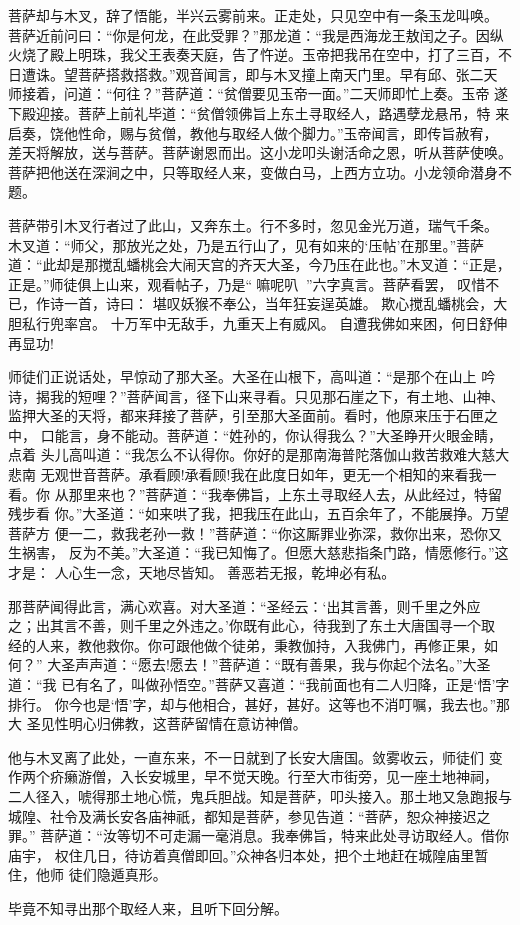 菩萨却与木叉，辞了悟能，半兴云雾前来。正走处，只见空中有一条玉龙叫唤。
菩萨近前问曰：“你是何龙，在此受罪？”那龙道：“我是西海龙王敖闰之子。因纵
火烧了殿上明珠，我父王表奏天庭，告了忤逆。玉帝把我吊在空中，打了三百，不
日遭诛。望菩萨搭救搭救。”观音闻言，即与木叉撞上南天门里。早有邱、张二天
师接着，问道：“何往？”菩萨道：“贫僧要见玉帝一面。”二天师即忙上奏。玉帝
遂下殿迎接。菩萨上前礼毕道：“贫僧领佛旨上东土寻取经人，路遇孽龙悬吊，特
来启奏，饶他性命，赐与贫僧，教他与取经人做个脚力。”玉帝闻言，即传旨赦宥，
差天将解放，送与菩萨。菩萨谢恩而出。这小龙叩头谢活命之恩，听从菩萨使唤。
菩萨把他送在深涧之中，只等取经人来，变做白马，上西方立功。小龙领命潜身不
题。

菩萨带引木叉行者过了此山，又奔东土。行不多时，忽见金光万道，瑞气千条。
木叉道：“师父，那放光之处，乃是五行山了，见有如来的‘压帖’在那里。”菩萨
道：“此却是那搅乱蟠桃会大闹天宫的齐天大圣，今乃压在此也。”木叉道：“正是，
正是。”师徒俱上山来，观看帖子，乃是“嘛呢叭”六字真言。菩萨看罢，
叹惜不已，作诗一首，诗曰：
堪叹妖猴不奉公，当年狂妄逞英雄。
欺心搅乱蟠桃会，大胆私行兜率宫。
十万军中无敌手，九重天上有威风。
自遭我佛如来困，何日舒伸再显功!

师徒们正说话处，早惊动了那大圣。大圣在山根下，高叫道：“是那个在山上
吟诗，揭我的短哩？”菩萨闻言，径下山来寻看。只见那石崖之下，有土地、山神、
监押大圣的天将，都来拜接了菩萨，引至那大圣面前。看时，他原来压于石匣之中，
口能言，身不能动。菩萨道：“姓孙的，你认得我么？”大圣睁开火眼金睛，点着
头儿高叫道：“我怎么不认得你。你好的是那南海普陀落伽山救苦救难大慈大悲南
无观世音菩萨。承看顾!承看顾!我在此度日如年，更无一个相知的来看我一看。你
从那里来也？”菩萨道：“我奉佛旨，上东土寻取经人去，从此经过，特留残步看
你。”大圣道：“如来哄了我，把我压在此山，五百余年了，不能展挣。万望菩萨方
便一二，救我老孙一救！”菩萨道：“你这厮罪业弥深，救你出来，恐你又生祸害，
反为不美。”大圣道：“我已知悔了。但愿大慈悲指条门路，情愿修行。”这才是：
人心生一念，天地尽皆知。
善恶若无报，乾坤必有私。

那菩萨闻得此言，满心欢喜。对大圣道：“圣经云：‘出其言善，则千里之外应
之；出其言不善，则千里之外违之。’你既有此心，待我到了东土大唐国寻一个取
经的人来，教他救你。你可跟他做个徒弟，秉教伽持，入我佛门，再修正果，如何？”
大圣声声道：“愿去!愿去！”菩萨道：“既有善果，我与你起个法名。”大圣道：“我
已有名了，叫做孙悟空。”菩萨又喜道：“我前面也有二人归降，正是‘悟’字排行。
你今也是‘悟’字，却与他相合，甚好，甚好。这等也不消叮嘱，我去也。”那大
圣见性明心归佛教，这菩萨留情在意访神僧。

他与木叉离了此处，一直东来，不一日就到了长安大唐国。敛雾收云，师徒们
变作两个疥癞游僧，入长安城里，早不觉天晚。行至大市街旁，见一座土地神祠，
二人径入，唬得那土地心慌，鬼兵胆战。知是菩萨，叩头接入。那土地又急跑报与
城隍、社令及满长安各庙神祇，都知是菩萨，参见告道：“菩萨，恕众神接迟之罪。”
菩萨道：“汝等切不可走漏一毫消息。我奉佛旨，特来此处寻访取经人。借你庙宇，
权住几日，待访着真僧即回。”众神各归本处，把个土地赶在城隍庙里暂住，他师
徒们隐遁真形。

毕竟不知寻出那个取经人来，且听下回分解。